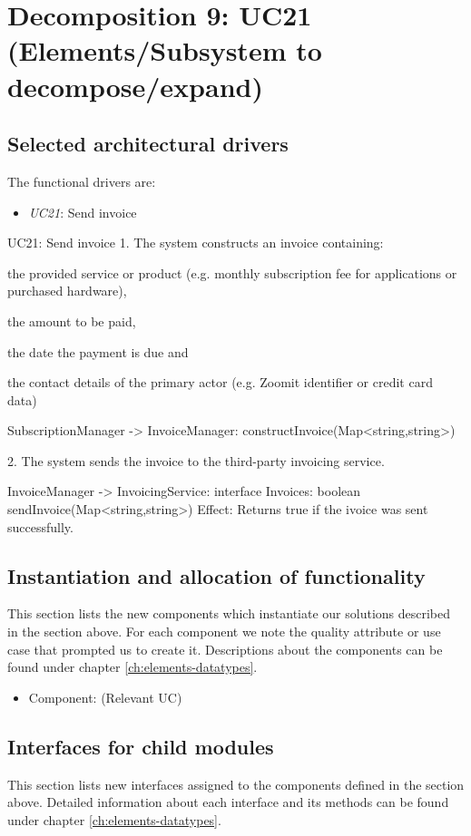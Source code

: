 \section{Decomposition 9: UC21 (Elements/Subsystem to decompose/expand)}


\subsection{Selected architectural drivers}
    The functional drivers are:
    \begin{itemize}
        \item \emph{UC21}: Send invoice
    \end{itemize}

    UC21: Send invoice
        1. The system constructs an invoice containing:
            { the provided service or product (e.g. monthly subscription fee for applications or purchased hardware),
            { the amount to be paid,
            { the date the payment is due and
            { the contact details of the primary actor (e.g. Zoomit identifier or credit card data)

                SubscriptionManager -> InvoiceManager: constructInvoice(Map<string,string>)

        2. The system sends the invoice to the third-party invoicing service.

            InvoiceManager -> InvoicingService: interface Invoices: boolean sendInvoice(Map<string,string>)
                Effect: Returns true if the ivoice was sent successfully.


\subsection{Instantiation and allocation of functionality}
    This section lists the new components which instantiate our solutions
    described in the section above. For each component we note the quality
    attribute or use case that prompted us to create it. Descriptions about
    the components can be found under chapter \ref{ch:elements-datatypes}. \\

    \begin{itemize}
        \item Component: (Relevant UC)
    \end{itemize}


\subsection{Interfaces for child modules}
    This section lists new interfaces assigned to the components defined
    in the section above. Detailed information about each interface and
    its methods can be found under chapter \ref{ch:elements-datatypes}.

}}}}
